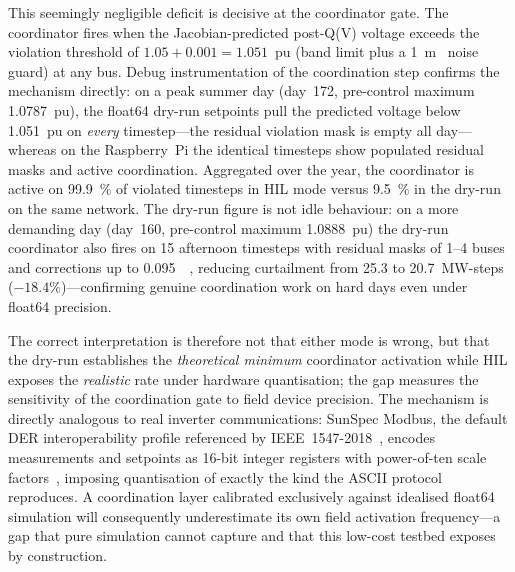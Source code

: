 \documentclass[conference]{IEEEtran}
\begin{document}
This seemingly negligible deficit is decisive at the coordinator gate.
The coordinator fires when the Jacobian-predicted post-Q(V) voltage
exceeds the violation threshold of $1.05 + 0.001 = 1.051$~pu (band limit
plus a \SI{1}{m} noise guard) at any bus. Debug instrumentation
of the coordination step confirms the mechanism directly: on a peak
summer day (day~172, pre-control maximum 1.0787~pu), the float64 dry-run
setpoints pull the predicted voltage below 1.051~pu on \emph{every}
timestep---the residual violation mask is empty all day---whereas on the
Raspberry~Pi the identical timesteps show populated residual masks and
active coordination. Aggregated over the year, the coordinator is active
on \SI{99.9}{\percent} of violated timesteps in HIL mode versus
\SI{9.5}{\percent} in the dry-run on the same network. The dry-run figure
is not idle behaviour: on a more demanding day (day~160, pre-control
maximum 1.0888~pu) the dry-run coordinator also fires on 15 afternoon
timesteps with residual masks of 1--4 buses and corrections up to
\SI{0.095}{\mega{}}, reducing curtailment from 25.3 to
20.7~MW-steps ($-18.4\%$)---confirming genuine coordination work on hard
days even under float64 precision.

The correct interpretation is therefore not that either mode is wrong,
but that the dry-run establishes the \emph{theoretical minimum}
coordinator activation while HIL exposes the \emph{realistic} rate under
hardware quantisation; the gap measures the sensitivity of the
coordination gate to field device precision. The mechanism is directly
analogous to real inverter communications: SunSpec Modbus, the default
DER interoperability profile referenced by
IEEE~1547-2018~\cite{ieee1547}, encodes measurements and setpoints as
16-bit integer registers with power-of-ten scale
factors~\cite{sunspec,modbus}, imposing quantisation of exactly the kind
the ASCII protocol reproduces. A coordination layer calibrated
exclusively against idealised float64 simulation will consequently
underestimate its own field activation frequency---a gap that pure
simulation cannot capture and that this low-cost testbed exposes by
construction.
\end{document}
